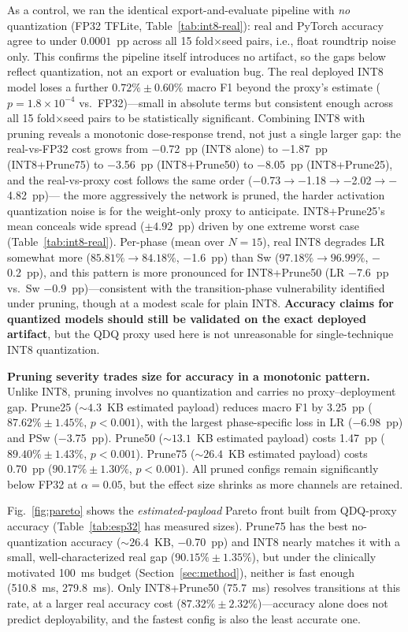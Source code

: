 \documentclass[conference]{IEEEtran}
\begin{document}


As a control, we ran the identical export-and-evaluate pipeline with \emph{no} quantization
(FP32 TFLite, Table~\ref{tab:int8-real}): real and PyTorch accuracy agree to under $0.0001$~pp
across all 15 fold$\times$seed pairs, i.e., float roundtrip noise only. This confirms the pipeline
itself introduces no artifact, so the gaps below reflect quantization, not an export or evaluation
bug. The real deployed INT8 model loses a further $0.72\%\pm0.60\%$ macro F1 beyond the proxy's estimate
($p{=}1.8\times10^{-4}$ vs.\ FP32)---small in absolute terms but consistent enough across all 15
fold$\times$seed pairs to be statistically significant. Combining INT8 with pruning reveals a
monotonic dose-response trend, not just a single larger gap: the real-vs-FP32 cost grows from
$-$0.72~pp (INT8 alone) to $-$1.87~pp (INT8+Prune75) to $-$3.56~pp (INT8+Prune50) to $-$8.05~pp
(INT8+Prune25), and the real-vs-proxy cost follows the same order ($-$0.73$\to-$1.18$\to-$2.02$\to-$4.82~pp)---
the more aggressively the network is pruned, the harder activation quantization noise is for the
weight-only proxy to anticipate. INT8+Prune25's mean conceals wide spread ($\pm4.92$~pp) driven by
one extreme worst case (Table~\ref{tab:int8-real}). Per-phase (mean over $N{=}15$), real INT8 degrades LR somewhat more
($85.81\%\to84.18\%$, $-$1.6~pp) than Sw ($97.18\%\to96.99\%$, $-$0.2~pp), and this pattern is more
pronounced for INT8+Prune50 (LR $-$7.6~pp vs.\ Sw $-$0.9~pp)---consistent with the transition-phase
vulnerability identified under pruning, though at a modest scale for plain INT8.
\textbf{Accuracy claims for quantized models should still be validated on the exact deployed
artifact}, but the QDQ proxy used here is not unreasonable for single-technique INT8 quantization.

\textbf{Pruning severity trades size for accuracy in a monotonic pattern.}
Unlike INT8, pruning involves no quantization and carries no proxy--deployment gap. Prune25
(${\sim}4.3$~KB estimated payload) reduces macro F1 by 3.25~pp ($87.62\%\pm1.45\%$, $p{<}0.001$),
with the largest
phase-specific loss in LR ($-$6.98~pp) and PSw ($-$3.75~pp). Prune50 (${\sim}13.1$~KB estimated
payload) costs 1.47~pp ($89.40\%\pm1.43\%$, $p{<}0.001$). Prune75 (${\sim}26.4$~KB estimated
payload) costs 0.70~pp ($90.17\%\pm1.30\%$, $p{<}0.001$). All pruned configs remain significantly
below FP32 at $\alpha{=}0.05$, but the effect size shrinks as more channels are retained.

Fig.~\ref{fig:pareto} shows the \emph{estimated-payload} Pareto front built from QDQ-proxy accuracy
(Table~\ref{tab:esp32} has measured sizes). Prune75 has the best no-quantization accuracy
(${\sim}26.4$~KB, $-$0.70~pp) and INT8 nearly matches it with a small, well-characterized real gap
($90.15\%\pm1.35\%$), but under the clinically motivated 100~ms budget (Section~\ref{sec:method}),
neither is fast enough (510.8~ms, 279.8~ms). Only INT8+Prune50 (75.7~ms) resolves transitions at
this rate, at a larger real accuracy cost ($87.32\%\pm2.32\%$)---accuracy alone does not predict
deployability, and the fastest config is also the least accurate one.
\end{document}
